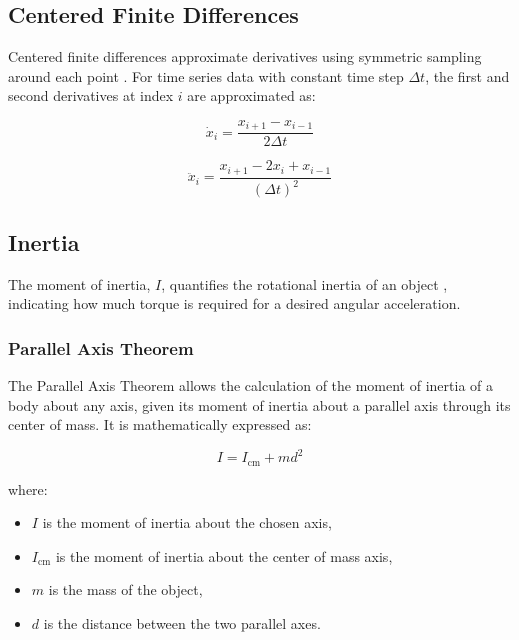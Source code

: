 \subsection{Centered Finite Differences}
Centered finite differences approximate derivatives using symmetric sampling around each point \cite{numerical_methods}. For time series data with constant time step \(\Delta t\), the first and second derivatives at index \(i\) are approximated as:

\begin{equation}
\label{eq:first_derivative}
\dot{x}_i = \frac{x_{i+1} - x_{i-1}}{2\Delta t}
\end{equation}

\begin{equation}
\label{eq:second_derivative}
\ddot{x}_i = \frac{x_{i+1} - 2x_i + x_{i-1}}{(\Delta t)^2}
\end{equation}

\subsection{Inertia}
\label{sec:inertia}
The moment of inertia, \(I\), quantifies the rotational inertia of an object \cite{taylor_mechanics}, indicating how much torque is required for a desired angular acceleration.

\subsubsection{Parallel Axis Theorem}
The Parallel Axis Theorem \cite{taylor_mechanics} allows the calculation of the moment of inertia of a body about any axis, given its moment of inertia about a parallel axis through its center of mass. It is mathematically expressed as:

\begin{equation}
\label{eq:parallel_axis_theorem}
I = I_{\text{cm}} + md^2
\end{equation}

where:
\begin{itemize}
    \item \(I\) is the moment of inertia about the chosen axis,
    \item \(I_{\text{cm}}\) is the moment of inertia about the center of mass axis,
    \item \(m\) is the mass of the object,
    \item \(d\) is the distance between the two parallel axes.
\end{itemize}

